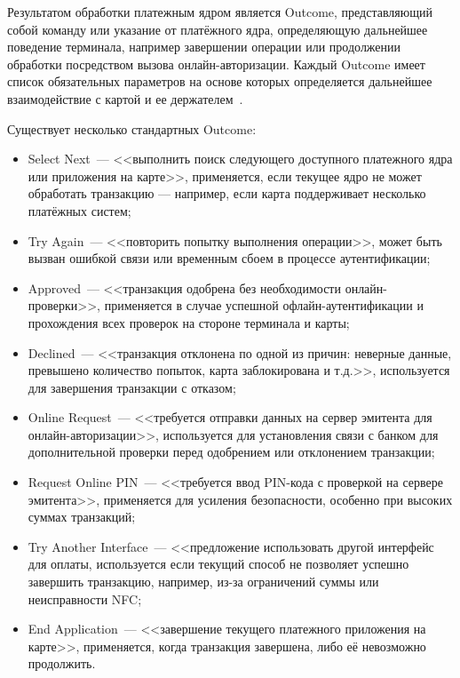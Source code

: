 Результатом обработки платежным ядром является Outcome, представляющий собой команду или указание от платёжного ядра, определяющую дальнейшее поведение терминала, например завершении операции или продолжении обработки посредством вызова онлайн-авторизации.
Каждый Outcome имеет список обязательных параметров на основе которых определяется дальнейшее взаимодействие с картой и ее держателем~\cite{emv_book_A}.

Существует несколько стандартных Outcome:

\begin{itemize}
    \item Select Next~--- <<выполнить поиск следующего доступного платежного ядра или приложения на карте>>, применяется, если текущее ядро не может обработать транзакцию — например, если карта поддерживает несколько платёжных систем;
    \item Try Again~--- <<повторить попытку выполнения операции>>, может быть вызван ошибкой связи или временным сбоем в процессе аутентификации;
    \item Approved~--- <<транзакция одобрена без необходимости онлайн-проверки>>, применяется в случае успешной офлайн-аутентификации и прохождения всех проверок на стороне терминала и карты;
    \item Declined~--- <<транзакция отклонена по одной из причин: неверные данные, превышено количество попыток, карта заблокирована и т.д.>>, используется для завершения транзакции с отказом;
    \item Online Request~--- <<требуется отправки данных на сервер эмитента для онлайн-авторизации>>, используется для установления связи с банком для дополнительной проверки перед одобрением или отклонением транзакции;
    \item Request Online PIN~--- <<требуется ввод PIN-кода с проверкой на сервере эмитента>>, применяется для усиления безопасности, особенно при высоких суммах транзакций;
    \item Try Another Interface~--- <<предложение использовать другой интерфейс для оплаты, используется если текущий способ не позволяет успешно завершить транзакцию, например, из-за ограничений суммы или неисправности NFC;
    \item End Application~--- <<завершение текущего платежного приложения на карте>>, применяется, когда транзакция завершена, либо её невозможно продолжить.
\end{itemize}




